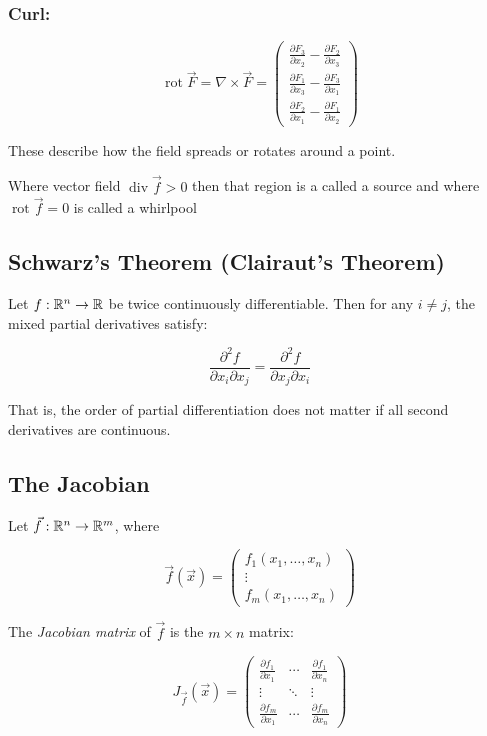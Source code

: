 \subsubsection{Curl:}

\[
    \operatorname{rot} \vec{F} = \nabla \times \vec{F} = \begin{pmatrix}
    \frac{\partial F_3}{\partial x_2} - \frac{\partial F_2}{\partial x_3} \\
    \frac{\partial F_1}{\partial x_3} - \frac{\partial F_3}{\partial x_1} \\
    \frac{\partial F_2}{\partial x_1} - \frac{\partial F_1}{\partial x_2}
    \end{pmatrix}
\]

These describe how the field spreads or rotates around a point.

Where vector field \( \operatorname{div}\vec{f} > 0\) then that region is a called a source
and where \(\operatorname{rot}\vec{f} = 0\) is called a whirlpool

\subsection{Schwarz’s Theorem (Clairaut’s Theorem)}

Let \( f : \mathbb{R}^n \to \mathbb{R} \) be twice continuously differentiable. Then for any \( i \ne j \), 
the mixed partial derivatives satisfy:

\[
    \frac{\partial^2 f}{\partial x_i \partial x_j} = \frac{\partial^2 f}{\partial x_j \partial x_i}
\]

That is, the order of partial differentiation does not matter if all second derivatives are continuous.

\subsection{The Jacobian}

Let \( \vec{f} : \mathbb{R}^n \to \mathbb{R}^m \), where

\[
    \vec{f}(\vec{x}) = \begin{pmatrix}
    f_1(x_1, \dots, x_n) \\
    \vdots \\
    f_m(x_1, \dots, x_n)
    \end{pmatrix}
\]

The \emph{Jacobian matrix} of \( \vec{f} \) is the \( m \times n \) matrix:

\[
    J_{\vec{f}}(\vec{x}) = \begin{pmatrix}
    \frac{\partial f_1}{\partial x_1} & \cdots & \frac{\partial f_1}{\partial x_n} \\
    \vdots & \ddots & \vdots \\
    \frac{\partial f_m}{\partial x_1} & \cdots & \frac{\partial f_m}{\partial x_n}
    \end{pmatrix}
\]

